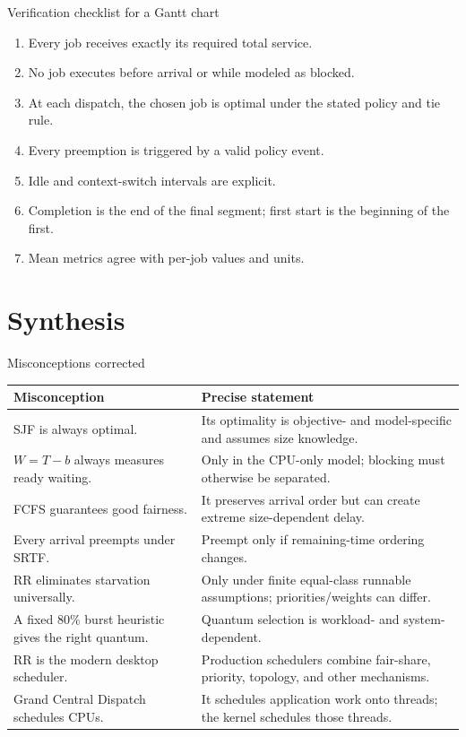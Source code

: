\documentclass[aspectratio=169,11pt]{beamer}
\begin{document}
\begin{frame}{Verification checklist for a Gantt chart}
  \begin{enumerate}
    \item Every job receives exactly its required total service.
    \item No job executes before arrival or while modeled as blocked.
    \item At each dispatch, the chosen job is optimal under the stated policy and tie rule.
    \item Every preemption is triggered by a valid policy event.
    \item Idle and context-switch intervals are explicit.
    \item Completion is the end of the final segment; first start is the beginning of the first.
    \item Mean metrics agree with per-job values and units.
  \end{enumerate}
\end{frame}

\section{Synthesis}

\begin{frame}{Misconceptions corrected}
  \small
  \begin{tabularx}{\textwidth}{@{}X@{\quad$\Rightarrow$\quad}X@{}}
    \toprule
    \textbf{Misconception} & \textbf{Precise statement} \\
    \midrule
    SJF is always optimal. & Its optimality is objective- and model-specific and assumes size knowledge. \\
    $W=T-b$ always measures ready waiting. & Only in the CPU-only model; blocking must otherwise be separated. \\
    FCFS guarantees good fairness. & It preserves arrival order but can create extreme size-dependent delay. \\
    Every arrival preempts under SRTF. & Preempt only if remaining-time ordering changes. \\
    RR eliminates starvation universally. & Only under finite equal-class runnable assumptions; priorities/weights can differ. \\
    A fixed 80\% burst heuristic gives the right quantum. & Quantum selection is workload- and system-dependent. \\
    RR is the modern desktop scheduler. & Production schedulers combine fair-share, priority, topology, and other mechanisms. \\
    Grand Central Dispatch schedules CPUs. & It schedules application work onto threads; the kernel schedules those threads. \\
    \bottomrule
  \end{tabularx}
\end{frame}
\end{document}
